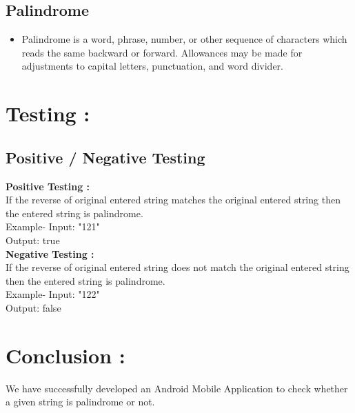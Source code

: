 \documentclass{article}
\begin{document}
\subsection{Palindrome} 
	\begin{itemize}
		\item Palindrome is a word, phrase, number, or other sequence of characters which reads the same backward or forward. Allowances may be made for adjustments to capital letters, punctuation, and word divider.
	\end{itemize}

\section{Testing :}

\subsection {Positive / Negative Testing}

\textbf{Positive Testing :}\\
If the reverse of original entered string matches the original entered string then the entered string is palindrome.\\
Example- Input: "121" \\
		 Output: true\\

\textbf{ Negative Testing :}\\
If the reverse of original entered string does not match the original entered string then the entered string is palindrome.\\
Example- Input: "122" \\
		 Output: false\\

\section{Conclusion : }

We have successfully developed an Android Mobile Application to check whether a given string is palindrome or not.
\end{document}

